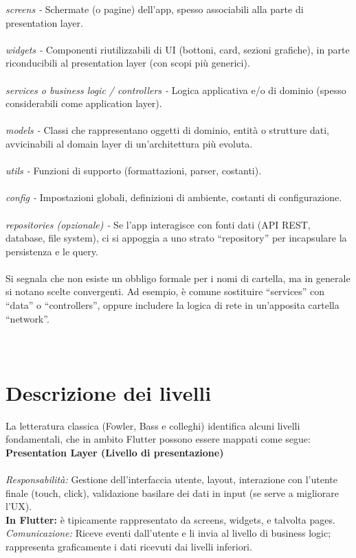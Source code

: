\documentclass[14pt]{extbook}
\begin{document}
\textit{screens -} Schermate (o pagine) dell’app, spesso associabili alla parte di presentation layer.\\\\
\textit{widgets -} Componenti riutilizzabili di UI (bottoni, card, sezioni grafiche), in parte riconducibili al presentation layer (con scopi più generici).\\\\
\textit{services o business logic / controllers -} Logica applicativa e/o di dominio (spesso considerabili come application layer).\\\\
\textit{models -} Classi che rappresentano oggetti di dominio, entità o strutture dati, avvicinabili al domain layer di un’architettura più evoluta.\\\\
\textit{utils -} Funzioni di supporto (formattazioni, parser, costanti).\\\\
\textit{config -} Impostazioni globali, definizioni di ambiente, costanti di configurazione.\\\\
\textit{repositories (opzionale) -} Se l’app interagisce con fonti dati (API REST, database, file system), ci si appoggia a uno strato “repository” per incapsulare la persistenza e le query.\\\\

Si segnala che non esiste un obbligo formale per i nomi di cartella, ma in generale si notano scelte convergenti. Ad esempio, è comune sostituire “services” con “data” o “controllers”, oppure includere la logica di rete in un’apposita cartella “network”.\\\\\\

\section{Descrizione dei livelli}
La letteratura classica (Fowler, Bass e colleghi) identifica alcuni livelli fondamentali, che in ambito Flutter possono essere mappati come segue:\\

\textbf{Presentation Layer (Livello di presentazione)}\\\\
\textit{Responsabilità:} Gestione dell’interfaccia utente, layout, interazione con l’utente finale (touch, click), validazione basilare dei dati in input (se serve a migliorare l’UX).\\
\textbf{In Flutter:} è tipicamente rappresentato da screens, widgets, e talvolta pages.\\
\textit{Comunicazione:} Riceve eventi dall’utente e li invia al livello di business logic; rappresenta graficamente i dati ricevuti dai livelli inferiori.\\\\
\end{document}
